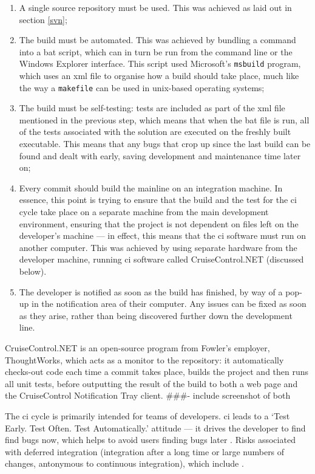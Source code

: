 \documentclass{l4proj}
\newcommand{\revisit}{\#\#\#}
\begin{document}
\begin{enumerate}
	\item A single source repository must be used.  This was achieved as laid out in section \ref{svn};
	\item The build must be automated.  This was achieved by bundling a command into a \gls{bat} script, which can in turn be run from the command line or the Windows Explorer interface.  This script used Microsoft's \texttt{msbuild} program, which uses an \gls{xml} file to organise how a build should take place, much like the way a \texttt{makefile} can be used in \gls{unix}-based operating systems;
	\item The build must be self-testing: tests are included as part of the \gls{xml} file mentioned in the previous step, which means that when the \gls{bat} file is run, all of the tests associated with the solution are executed on the freshly built executable.  This means that any bugs that crop up since the last build can be found and dealt with early, saving development and maintenance time later on;
	\item Every commit should build the mainline on an integration machine. In essence, this point is trying to ensure that the build and the test for the \gls{ci} cycle take place on a separate machine from the main development environment, ensuring that the project is not dependent on files left on the developer's machine --- in effect, this means that the \gls{ci} software must run on another computer.  This was achieved by using separate hardware from the developer machine, running \gls{ci} software called CruiseControl.NET (discussed below).  
	\item The developer is notified as soon as the build has finished, by way of a pop-up in the notification area of their computer.  Any issues can be fixed as soon as they arise, rather than being discovered further down the development line.
\end{enumerate}

CruiseControl.NET is an open-source program from Fowler's employer, ThoughtWorks, which acts as a monitor to the repository: it automatically checks-out code each time a commit takes place, builds the project and then runs all unit tests, before outputting the result of the build to both a web page and the CruiseControl Notification Tray client. \revisit - include screenshot of both

The \gls{ci} cycle is primarily intended for teams of developers. \gls{ci} leads to a `Test Early. Test Often. Test Automatically.' attitude --- it drives the developer to find find bugs now, which helps to avoid users finding bugs later \cite{pragmaticProgrammer}. Risks associated with deferred integration (integration after a long time or large numbers of changes, antonymous to continuous integration), which include .
\end{document}
